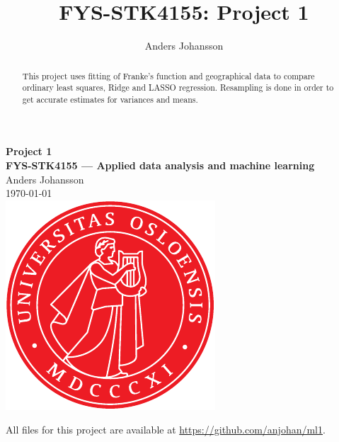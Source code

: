\documentclass[11pt,british,a4paper]{article}
\numberwithin{equation}{section}
\begin{document}
\title{FYS-STK4155: Project 1}
\author{Anders Johansson}

\begin{titlepage}
\vspace*{\fill}
\begin{center}
\textsf{
    \Huge \textbf{Project 1}\\\vspace{0.5cm}
    \Large \textbf{FYS-STK4155 --- Applied data analysis and machine learning}\\
    \vspace{8cm}
    Anders Johansson\\
    \today\\
}
\vspace{1.5cm}
\includegraphics{uio.pdf}\\
\vspace*{\fill}
\end{center}
\end{titlepage}
\null
\pagestyle{empty}
\newpage

\pagestyle{fancy}
\setcounter{page}{1}

\begin{abstract}
    This project uses fitting of Franke's function and geographical data to compare ordinary least squares, Ridge and LASSO regression. Resampling is done in order to get accurate estimates for variances and means.
\end{abstract}

All files for this project are available at \url{https://github.com/anjohan/ml1}.

\tableofcontents
\end{document}
